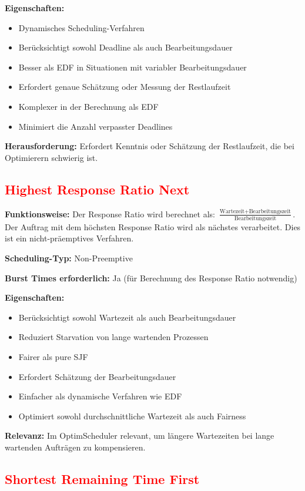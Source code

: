 \textbf{Eigenschaften:}
\begin{itemize}
    \item Dynamisches Scheduling-Verfahren
    \item Berücksichtigt sowohl Deadline als auch Bearbeitungsdauer
    \item Besser als EDF in Situationen mit variabler Bearbeitungsdauer
    \item Erfordert genaue Schätzung oder Messung der Restlaufzeit
    \item Komplexer in der Berechnung als EDF
    \item Minimiert die Anzahl verpasster Deadlines
\end{itemize}

\textbf{Herausforderung:} Erfordert Kenntnis oder Schätzung der Restlaufzeit, die bei Optimierern schwierig ist.

\subsection{\textcolor{red}{Highest Response Ratio Next}}

\textbf{Funktionsweise:} Der Response Ratio wird berechnet als: $\frac{\text{Wartezeit} + \text{Bearbeitungszeit}}{\text{Bearbeitungszeit}}$. Der Auftrag mit dem höchsten Response Ratio wird als nächstes verarbeitet. Dies ist ein nicht-präemptives Verfahren.

\textbf{Scheduling-Typ:} Non-Preemptive

\textbf{Burst Times erforderlich:} Ja (für Berechnung des Response Ratio notwendig)

\textbf{Eigenschaften:}
\begin{itemize}
    \item Berücksichtigt sowohl Wartezeit als auch Bearbeitungsdauer
    \item Reduziert Starvation von lange wartenden Prozessen
    \item Fairer als pure SJF
    \item Erfordert Schätzung der Bearbeitungsdauer
    \item Einfacher als dynamische Verfahren wie EDF
    \item Optimiert sowohl durchschnittliche Wartezeit als auch Fairness
\end{itemize}

\textbf{Relevanz:} Im OptimScheduler relevant, um längere Wartezeiten bei lange wartenden Aufträgen zu kompensieren.

\subsection{\textcolor{red}{Shortest Remaining Time First}}

